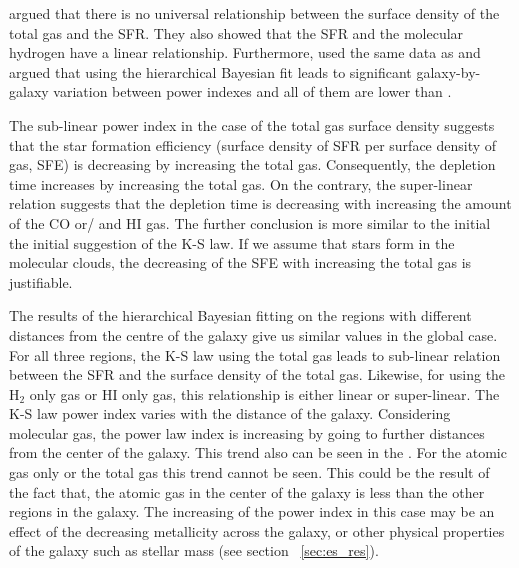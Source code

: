 \documentclass[useAMS,usenatbib]{mn2e}
\begin{document}
 \cite{Bigiel08} argued that there is no universal relationship between the surface density of the total gas and the SFR. They also showed that the SFR and the molecular hydrogen have a linear relationship. Furthermore, \cite{Shetty13} used the same data as \cite{Bigiel08} and argued that using the hierarchical Bayesian fit leads to significant galaxy-by-galaxy variation between power indexes and all of them are lower than \cite{Bigiel08}. 

The sub-linear power index in the case of the total gas surface density suggests that the star formation efficiency (surface density of SFR per surface density of gas, SFE) is decreasing by increasing the total gas. Consequently, the depletion time increases by increasing the total gas. On the contrary, the super-linear relation suggests that the depletion time is decreasing with increasing the amount of the CO or/ and HI gas. The further conclusion is more similar to the initial the initial suggestion of the K-S law. %
If we assume that stars form in the molecular clouds, the decreasing of the SFE with increasing the total gas is justifiable.  

The results of the hierarchical Bayesian fitting on the regions with different distances from the centre of the galaxy give us similar values in the global case. For all three regions, the K-S law using the total gas leads to sub-linear relation between the SFR and the surface density of the total gas. Likewise, for using the H$_{2}$ only gas or HI only gas, this relationship is either linear or super-linear. The K-S law power index varies with the distance of the galaxy. Considering molecular gas, the power law index is increasing by going to further distances from the center of the galaxy. This trend also can be seen in the \cite{Ford13}. For the atomic gas only or the total gas this trend cannot be seen. This could be the result of the fact that, the atomic gas in the center of the galaxy is less than the other regions in the galaxy. 
The increasing of the power index in this case may be an effect of the decreasing metallicity across the galaxy, or other physical properties of the galaxy such as stellar mass (see section ~\ref{sec:es_res}).
  
\end{document}
